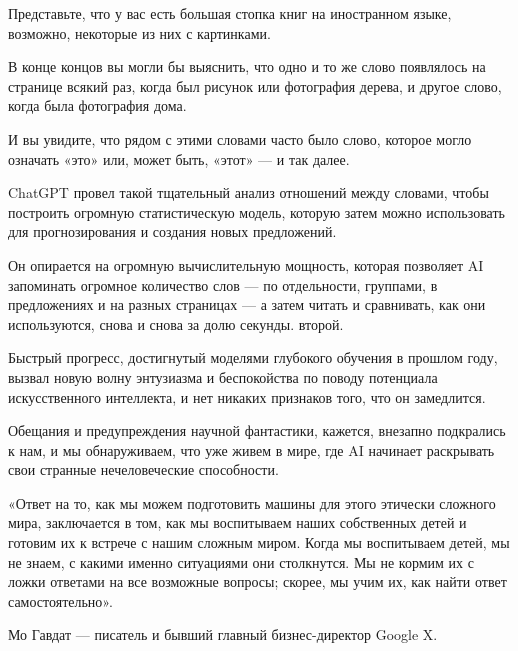 Представьте, что у вас есть большая стопка книг на иностранном языке, возможно, некоторые из них с картинками.

В конце концов вы могли бы выяснить, что одно и то же слово появлялось на странице всякий раз, когда был рисунок или фотография дерева, и другое слово, когда была фотография дома.

И вы увидите, что рядом с этими словами часто было слово, которое могло означать «это» или, может быть, «этот» — и так далее.

ChatGPT провел такой тщательный анализ отношений между словами, чтобы построить огромную статистическую модель, которую затем можно использовать для прогнозирования и создания новых предложений.

Он опирается на огромную вычислительную мощность, которая позволяет AI запоминать огромное количество слов — по отдельности, группами, в предложениях и на разных страницах — а затем читать и сравнивать, как они используются, снова и снова за долю секунды. второй.

Быстрый прогресс, достигнутый моделями глубокого обучения в прошлом году, вызвал новую волну энтузиазма и беспокойства по поводу потенциала искусственного интеллекта, и нет никаких признаков того, что он замедлится.

Обещания и предупреждения научной фантастики, кажется, внезапно подкрались к нам, и мы обнаруживаем, что уже живем в мире, где AI начинает раскрывать свои странные нечеловеческие способности.

\begin{fancyquotes}
    «Ответ на то, как мы можем подготовить машины для этого этически сложного мира, заключается в том, как мы воспитываем наших собственных детей и готовим их к встрече с нашим сложным миром. Когда мы воспитываем детей, мы не знаем, с какими именно ситуациями они столкнутся. Мы не кормим их с ложки ответами на все возможные вопросы; скорее, мы учим их, как найти ответ самостоятельно».\\

    \begin{flushright}
        Мо Гавдат — писатель и бывший главный бизнес-директор Google X.
    \end{flushright}
\end{fancyquotes}




\clearpage



